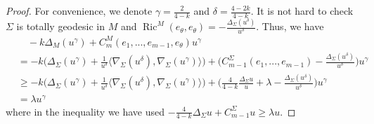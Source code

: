 \documentclass[10pt,a4paper]{amsart}
\DeclareMathOperator{\Ric}{Ric}
\begin{document}
\begin{proof}
    For convenience, we denote $\gamma=\frac{2}{4-k}$ and $\delta=\frac{4-2k}{4-k}$.
    It is not hard to check $\Sigma$ is totally geodesic in $M$ and $\Ric^{M}(e_{\theta},e_{\theta} )=-\frac{\Delta_{\Sigma}(u^{\delta})}{u^{\delta}}$. Thus, we have
    \[
    \begin{aligned}
    &\quad -k\Delta_{M}(u^{\gamma})+C_{m}^{M}(e_{1},...,e_{m-1},e_{\theta})u^{\gamma}\\
    &=-k\big(\Delta_{\Sigma}(u^{\gamma})+\frac{1}{u^{\delta}}\langle \nabla_{\Sigma}(u^{\delta}),\nabla_{\Sigma}(u^{\gamma})\rangle\big) +\big(C_{m-1}^{\Sigma}(e_{1},...,e_{m-1})-\frac{\Delta_{\Sigma}(u^{\delta})}{u^{\delta}}\big)u^{\gamma}   \\
    &\geq -k\big(\Delta_{\Sigma}(u^{\gamma})+\frac{1}{u^{\delta}}\langle \nabla_{\Sigma}(u^{\delta}),\nabla_{\Sigma}(u^{\gamma})\rangle\big) +\big(\frac{4}{4-k}\frac{\Delta_{\Sigma}u}{u}+\lambda-\frac{\Delta_{\Sigma}(u^{\delta})}{u^{\delta}}\big)u^{\gamma}\\
    &=\lambda u^\gamma
    \end{aligned}
    \]
    where in the inequality we have used $-\frac{4}{4-k}\Delta_{\Sigma}u+C_{m-1}^{\Sigma}u\geq \lambda u$.


\end{proof}
\end{document}
